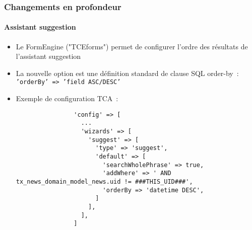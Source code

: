 \begin{frame}[fragile]
	\frametitle{Changements en profondeur}
	\framesubtitle{Assistant suggestion}

	\lstset{basicstyle=\tiny\ttfamily}

	\begin{itemize}
		\item Le FormEngine ("TCEforms") permet de configurer l'ordre des
			résultats de l'assistant suggestion
		\item La nouvelle option est une définition standard de clause SQL order-by~:\newline
			\small\texttt{'orderBy' => 'field ASC/DESC'}\normalsize
		\item Exemple de configuration TCA~:

			\begin{lstlisting}
				'config' => [
				  ...
				  'wizards' => [
				    'suggest' => [
				      'type' => 'suggest',
				      'default' => [
				        'searchWholePhrase' => true,
				        'addWhere' => ' AND tx_news_domain_model_news.uid != ###THIS_UID###',
				        'orderBy => 'datetime DESC',
				      ]
				    ],
				  ],
				]
			\end{lstlisting}

	\end{itemize}

\end{frame}











